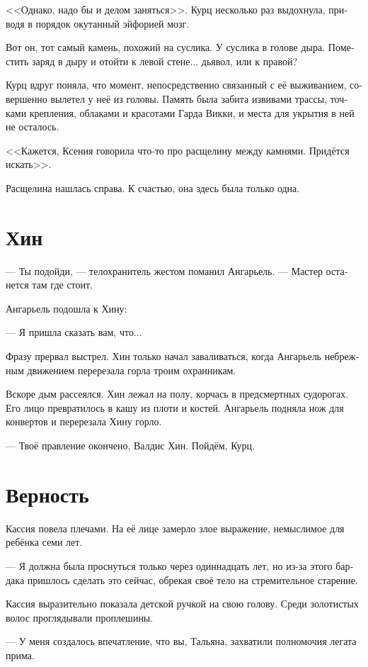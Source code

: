 \documentclass[a4paper,12pt,fleqn]{book}\usepackage{polyglossia}\setdefaultlanguage[babelshorthands=true]{russian}\setotherlanguage{english}\defaultfontfeatures{Ligatures=TeX,Mapping=tex-text}\usepackage{xcolor}\newcommand{\ml}[3]{#2}
\begin{document}
<<Однако, надо бы и делом заняться>>.
Курц несколько раз выдохнула, приводя в порядок окутанный эйфорией мозг.

Вот он, тот самый камень, похожий на суслика.
У суслика в голове дыра.
Поместить заряд в дыру и отойти к левой стене... дьявол, или к правой?

Курц вдруг поняла, что момент, непосредственно связанный с её выживанием, совершенно вылетел у неё из головы.
Память была забита извивами трассы, точками крепления, облаками и красотами Гарда Викки, и места для укрытия в ней не осталось.

<<Кажется, Ксения говорила что-то про расщелину между камнями.
Придётся искать>>.

Расщелина нашлась справа.
К счастью, она здесь была только одна.

\section{Хин}

--- Ты подойди, --- телохранитель жестом поманил Ангарьель.
--- Мастер останется там где стоит.

Ангарьель подошла к Хину:

--- Я пришла сказать вам, что...

Фразу прервал выстрел.
Хин только начал заваливаться, когда Ангарьель небрежным движением перерезала горла троим охранникам.

Вскоре дым рассеялся.
Хин лежал на полу, корчась в предсмертных судорогах.
Его лицо превратилось в кашу из плоти и костей.
Ангарьель подняла нож для конвертов и перерезала Хину горло.

--- Твоё правление окончено, Валдис Хин.
Пойдём, Курц.

\section{Верность}

Кассия повела плечами.
На её лице замерло злое выражение, немыслимое для ребёнка семи лет.

--- Я должна была проснуться только через одиннадцать лет, но из-за этого бардака пришлось сделать это сейчас, обрекая своё тело на стремительное старение.

Кассия выразительно показала детской ручкой на свою голову.
Среди золотистых волос проглядывали проплешины.

--- У меня создалось впечатление, что вы, Тальяна, захватили полномочия легата прима.
\end{document}
